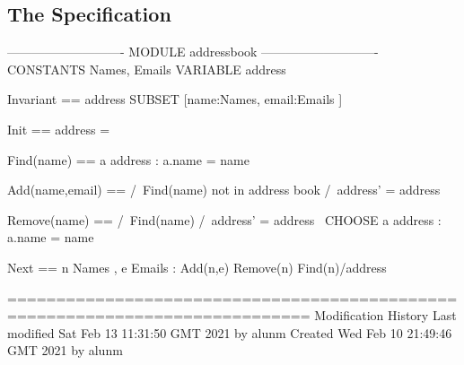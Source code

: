 \documentclass[12pt]{article}
\begin{document}
\subsection{The Specification} 
\begin{tla}
---------------------------- MODULE addressbook ----------------------------
CONSTANTS Names, Emails
VARIABLE address

Invariant == address \in SUBSET [name:Names, email:Emails ]

Init == address = {}

Find(name) ==  
     \E a \in address : a.name = name


Add(name,email) == 
    /\ \lnot Find(name)  \* not in address book
    /\ address' = address 

Remove(name) == 
    /\ Find(name)
    /\ address' = address \ {CHOOSE a \in address : a.name = name }

Next == 
    \E n \in Names , e \in Emails : 
        \/ Add(n,e)
        \/ Remove(n)
        \/ Find(n)/\UNCHANGED address

=============================================================================
\* Modification History
\* Last modified Sat Feb 13 11:31:50 GMT 2021 by alunm
\* Created Wed Feb 10 21:49:46 GMT 2021 by alunm
\end{tla}
\begin{tlatex}
\@x{}\moduleLeftDash{}\moduleRightDash\@xx{}%
%
%
\@pvspace{8.0pt}%
\@pvspace{8.0pt}%
%
\@pvspace{8.0pt}%
%
%
\@pvspace{16.0pt}%
%
%
%
\@xx{}%
\@pvspace{8.0pt}%
%
%
\@pvspace{8.0pt}%
%
%
%
%
%
\@pvspace{8.0pt}%
\@x{}\bottombar\@xx{}%
\@x{}%
%
\@xx{}%
\@x{}%
%
\@xx{}%
\@x{}%
%
\@xx{}%
\end{tlatex}
\end{document}
